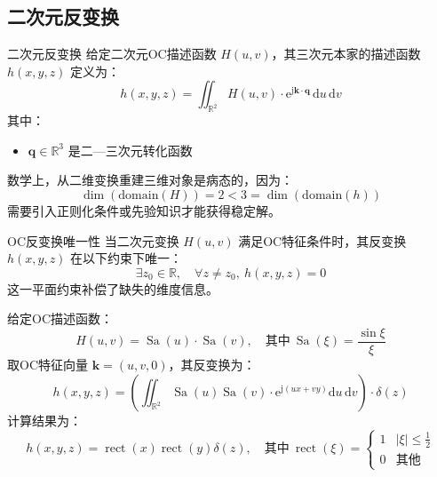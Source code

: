 \documentclass[lang=cn,newtx,10pt,scheme=chinese]{elegantbook}
\newcommand{\md}{\mathrm{d}}
\newcommand{\me}{\mathrm{e}}
\newcommand{\mj}{\mathrm{j}}
\begin{document}
\subsection{二次元反变换}

\begin{definition}{二次元反变换}
    给定二次元OC描述函数 \( H(u, v) \)，其三次元本家的描述函数 \( h(x,y,z) \) 定义为：
    \[
        h(x,y,z) = \iint_{\mathbb{R}^2} H(u, v) \cdot \me^{\mj \bm{k} \cdot \bm{q}} \,\md u\,\md v
    \]
    其中：
    \begin{itemize}
        \item \(\bm{q}\in\mathbb{R}^3\) 是二—三次元转化函数
    \end{itemize}
\end{definition}

\begin{theorem}[信息损失]
    数学上，从二维变换重建三维对象是病态的，因为：
    \[
        \dim(\text{domain}(H)) = 2 < 3 = \dim(\text{domain}(h))
    \]
    需要引入正则化条件或先验知识才能获得稳定解。
\end{theorem}

\begin{theorem}{OC反变换唯一性}
    当二次元变换 \( H(u, v) \) 满足OC特征条件时，其反变换 \( h(x,y,z) \) 在以下约束下唯一：
    \[
        \exists z_0 \in \mathbb{R}, \quad \forall z \neq z_0, \ h(x,y,z) = 0
    \]
    这一平面约束补偿了缺失的维度信息。
\end{theorem}

\begin{example}
    给定OC描述函数：
    \[ H(u, v) = \operatorname{Sa}(u) \cdot \operatorname{Sa}(v), \quad \text{其中} \ \operatorname{Sa}(\xi) = \frac{\sin \xi}{\xi} \]
    取OC特征向量 \(\bm{k} = (u, v, 0)\)，其反变换为：
    \[ h(x,y,z) = \left( \iint_{\mathbb{R}^2} \operatorname{Sa}(u) \operatorname{Sa}(v) \cdot \me^{\mj (ux + vy)} \md u\,\md v \right) \cdot \delta(z) \]
    计算结果为：
    \[ h(x,y,z) = \operatorname{rect}(x) \operatorname{rect}(y) \delta(z), \quad \text{其中} \ \operatorname{rect}(\xi) = \begin{cases}
            1 & |\xi| \leq \frac{1}{2} \\
            0 & \text{其他}
        \end{cases} \]
\end{example}
\end{document}
